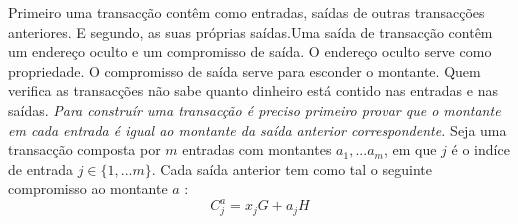 Primeiro uma transacção contêm como entradas, saídas de outras transacções anteriores. E segundo, as suas próprias saídas.\newline Uma saída de transacção contêm um endereço oculto e um compromisso de saída.
O endereço oculto serve como propriedade. O compromisso de saída serve para esconder o montante. Quem verifica as transacções não sabe quanto dinheiro está contido nas entradas e nas saídas.\newline\newline
{\em Para construír uma transacção é preciso primeiro provar que o montante em cada entrada é igual ao montante da saída anterior correspondente. }
\newline\newline
Seja uma transacção composta por $m$ entradas com montantes \(a_1, ... a_m\), em que $j$ é o indíce de entrada $j\in\{1,... m\}$.
Cada saída anterior tem como tal o seguinte compromisso ao montante $a$ :\vspace{.175cm}
\[C^a_{j} = x_j G + a_j H \]
  


